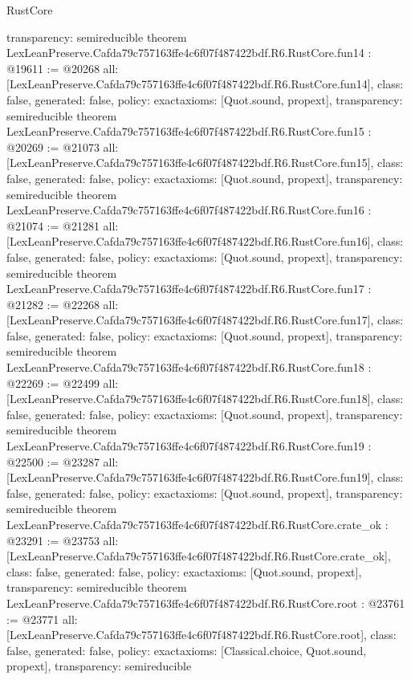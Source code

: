 \begin{lexlean}{RustCore}
\begin{coremodule}
{  transparency: semireducible
}
theorem LexLeanPreserve.Cafda79c757163ffe4c6f07f487422bdf.R6.RustCore.fun14 : @19611 := @20268 {
  all: [LexLeanPreserve.Cafda79c757163ffe4c6f07f487422bdf.R6.RustCore.fun14],
  class: false,
  generated: false,
  policy: exact{axioms: [Quot.sound, propext]},
  transparency: semireducible
}
theorem LexLeanPreserve.Cafda79c757163ffe4c6f07f487422bdf.R6.RustCore.fun15 : @20269 := @21073 {
  all: [LexLeanPreserve.Cafda79c757163ffe4c6f07f487422bdf.R6.RustCore.fun15],
  class: false,
  generated: false,
  policy: exact{axioms: [Quot.sound, propext]},
  transparency: semireducible
}
theorem LexLeanPreserve.Cafda79c757163ffe4c6f07f487422bdf.R6.RustCore.fun16 : @21074 := @21281 {
  all: [LexLeanPreserve.Cafda79c757163ffe4c6f07f487422bdf.R6.RustCore.fun16],
  class: false,
  generated: false,
  policy: exact{axioms: [Quot.sound, propext]},
  transparency: semireducible
}
theorem LexLeanPreserve.Cafda79c757163ffe4c6f07f487422bdf.R6.RustCore.fun17 : @21282 := @22268 {
  all: [LexLeanPreserve.Cafda79c757163ffe4c6f07f487422bdf.R6.RustCore.fun17],
  class: false,
  generated: false,
  policy: exact{axioms: [Quot.sound, propext]},
  transparency: semireducible
}
theorem LexLeanPreserve.Cafda79c757163ffe4c6f07f487422bdf.R6.RustCore.fun18 : @22269 := @22499 {
  all: [LexLeanPreserve.Cafda79c757163ffe4c6f07f487422bdf.R6.RustCore.fun18],
  class: false,
  generated: false,
  policy: exact{axioms: [Quot.sound, propext]},
  transparency: semireducible
}
theorem LexLeanPreserve.Cafda79c757163ffe4c6f07f487422bdf.R6.RustCore.fun19 : @22500 := @23287 {
  all: [LexLeanPreserve.Cafda79c757163ffe4c6f07f487422bdf.R6.RustCore.fun19],
  class: false,
  generated: false,
  policy: exact{axioms: [Quot.sound, propext]},
  transparency: semireducible
}
theorem LexLeanPreserve.Cafda79c757163ffe4c6f07f487422bdf.R6.RustCore.crate_ok : @23291 := @23753 {
  all: [LexLeanPreserve.Cafda79c757163ffe4c6f07f487422bdf.R6.RustCore.crate_ok],
  class: false,
  generated: false,
  policy: exact{axioms: [Quot.sound, propext]},
  transparency: semireducible
}
theorem LexLeanPreserve.Cafda79c757163ffe4c6f07f487422bdf.R6.RustCore.root : @23761 := @23771 {
  all: [LexLeanPreserve.Cafda79c757163ffe4c6f07f487422bdf.R6.RustCore.root],
  class: false,
  generated: false,
  policy: exact{axioms: [Classical.choice, Quot.sound, propext]},
  transparency: semireducible
}


\end{coremodule}
\end{lexlean}
